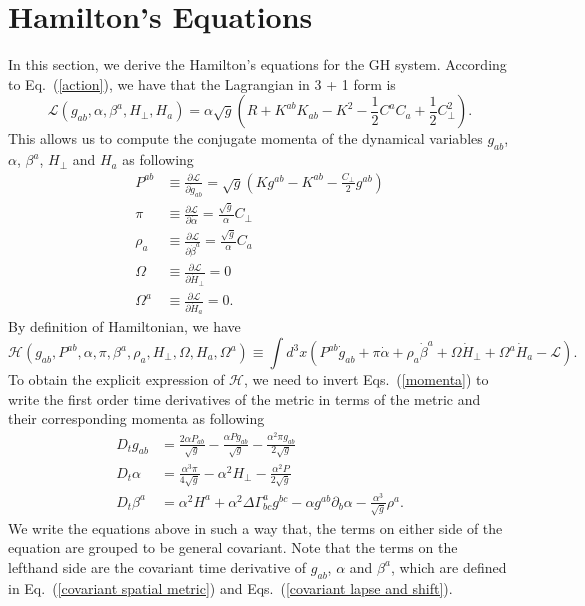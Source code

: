 \documentclass[letterpaper,nofootinbib,prd,amsmath,onecolumn]{revtex4-1}
\begin{document}
\section{Hamilton's Equations}\label{hamiltonian}
In this section, we derive the Hamilton's equations for the GH system. 
According to Eq.~(\ref{action}), we have that the Lagrangian in 3 + 1 form is
\begin{equation}
\mathscr{L}(g_{ab}, \alpha, \beta^{a}, H_{\perp}, H_{a}) = \alpha \sqrt{g} \left( R + K^{ab}K_{ab} - K^{2} - \frac{1}{2}C^{a}C_{a} + \frac{1}{2}C_{\perp}^{2}\right).
\end{equation}
This allows us to compute the conjugate momenta of the dynamical variables $g_{ab}$, $\alpha$, $\beta^{a}$, $H_{\perp}$ and $H_{a}$ as following
\begin{subequations}\label{momenta}
\begin{align}
P^{ab} & \equiv \frac{\partial \mathscr{L}}{\partial {\dot g}_{ab}} = \sqrt{g}\left(Kg^{ab} - K^{ab} - \frac{C_{\perp}}{2}g^{ab}\right)\\
\pi & \equiv \frac{\partial \mathscr{L}}{\partial {\dot \alpha}} = \frac{\sqrt{g}}{\alpha}C_{\perp}\\
\rho_{a} & \equiv \frac{\partial \mathscr{L}}{\partial {\dot \beta}^{a}} = \frac{\sqrt{g}}{\alpha}C_{a}\\
\Omega & \equiv \frac{\partial \mathscr{L}}{\partial {\dot H}_{\perp}} = 0\\
\Omega^{a} & \equiv \frac{\partial \mathscr{L}}{\partial {\dot H}_{a}} = 0.  
\end{align}
\end{subequations}
By definition of Hamiltonian, we have
\begin{equation}
\mathscr{H}( g_{ab}, P^{ab}, \alpha, \pi, \beta^{a}, \rho_{a}, H_{\perp}, \Omega, H_{a}, \Omega^{a} ) \equiv \int d^{3}x \left(P^{ab}{\dot g}_{ab} + \pi{\dot \alpha} + \rho_{a}{\dot \beta}^{a} + \Omega {\dot H}_{\perp} + \Omega^{a}{\dot H}_{a} - \mathscr{L} \right). 
\end{equation}
To obtain the explicit expression of $\mathscr{H}$, we need to invert Eqs.~(\ref{momenta}) to write the first order time derivatives of the metric in terms of the metric and their corresponding momenta as following
\begin{subequations}
\begin{align}
D_{t}g_{ab} & = \frac{2\alpha P_{ab}}{\sqrt{g}} - \frac{\alpha P g_{ab}}{\sqrt{g}} - \frac{\alpha^{2}\pi g_{ab}}{2\sqrt{g}}\\
D_{t}\alpha & = \frac{\alpha^{3}\pi}{4\sqrt{g}} - \alpha^{2}H_{\perp} - \frac{\alpha^{2}P}{2\sqrt{g}}\\
D_{t}\beta^{a} & = \alpha^{2}H^{a} + \alpha^{2}\Delta \Gamma^{a}_{bc}g^{bc} - \alpha g^{ab}\partial_{b}\alpha - \frac{\alpha^{3}}{\sqrt{g}}\rho^{a}.
\end{align}
\end{subequations}
We write the equations above in such a way that, the terms on either side of the equation are grouped to be general covariant\cite{Meng}. Note that the terms on the lefthand side are the covariant time derivative of $g_{ab}$, $\alpha$ and $\beta^{a}$, which are defined in Eq.~(\ref{covariant spatial metric}) and Eqs.~(\ref{covariant lapse and shift}). 
\end{document}
